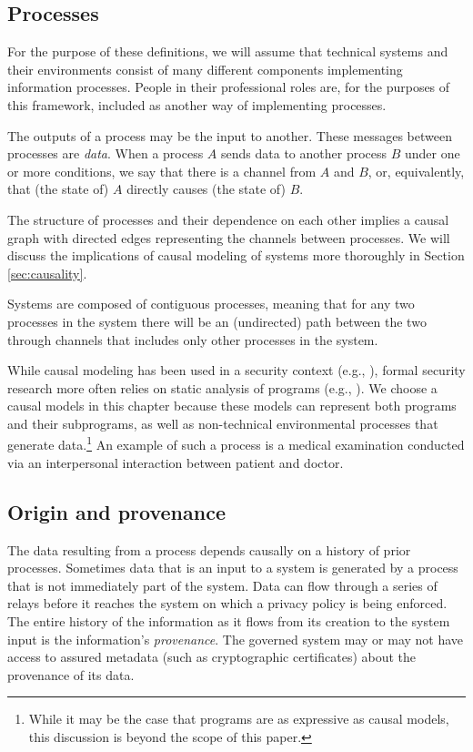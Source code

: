 \documentclass[../thesis.tex]{subfiles}
\begin{document}
\subsection{Processes}

For the purpose of these definitions, we will assume that
technical systems and their environments consist of many
different components implementing information processes.
People in their professional roles are, for the purposes of 
this framework, included as another way of implementing processes.

The outputs of a process may be the input to another.
These messages between processes are \emph{data}.
When a process $A$ sends data to another process $B$ under one or
more conditions, we say that there is a channel from $A$ and $B$,
or, equivalently, that (the state of) $A$ directly causes
(the state of) $B$.

The structure of processes and their dependence on each other
implies a causal graph \cite{pearl1988probabilistic} with directed
edges representing the channels between processes.
We will discuss the implications of causal modeling of systems
more thoroughly in Section \ref{sec:causality}.

%
%

Systems are composed of contiguous processes,
meaning that for any two processes in the system there will
be an (undirected) path between the two through channels that
includes only other processes in the system.

While causal modeling has been used in a security context
(e.g., \citet{feng2014security}), formal security research
more often relies on static analysis of programs (e.g., \citet{mclean90sp}).
We choose a causal models in this chapter because
these models can represent both programs and their
subprograms,
as well as non-technical environmental processes
that generate data.\footnote{While it may be the case that
  programs are as expressive as causal models, this
discussion is beyond the scope of this paper.}
An example of such a process is a medical examination
conducted via an interpersonal interaction between
patient and doctor.

\subsection{Origin and provenance}

The data resulting from a process depends causally
on a history of prior processes.
Sometimes data that is an input to a system
is generated by a process that is not immediately part
of the system.
Data can flow through 
a series of relays before it reaches
the system on which a privacy policy is being enforced.
The entire history of the information as it flows from its 
creation to the system input is the information's 
\emph{provenance}.
The governed system may or may not have access to
assured metadata (such as cryptographic certificates)
about the provenance of its data.
\end{document}
